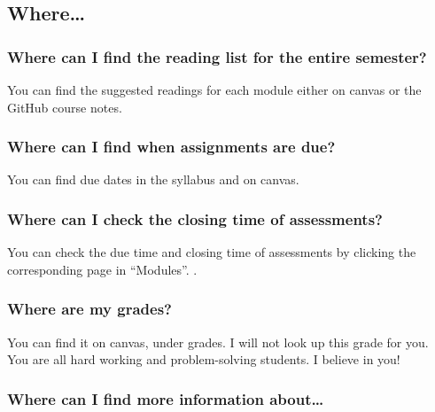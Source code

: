\hypertarget{where}{%
\subsection{Where\ldots{}}\label{where}}

\hypertarget{where-can-i-find-the-reading-list-for-the-entire-semester}{%
\subsubsection{Where can I find the reading list for the entire semester?}\label{where-can-i-find-the-reading-list-for-the-entire-semester}}

You can find the suggested readings for each module either on canvas or the GitHub course notes.

\hypertarget{where-can-i-find-when-assignments-are-due}{%
\subsubsection{Where can I find when assignments are due?}\label{where-can-i-find-when-assignments-are-due}}

You can find due dates in the syllabus and on canvas.

\hypertarget{where-can-i-check-the-closing-time-of-assessments}{%
\subsubsection{Where can I check the closing time of assessments?}\label{where-can-i-check-the-closing-time-of-assessments}}

You can check the due time and closing time of assessments by clicking the corresponding page in ``Modules''. .

\hypertarget{where-are-my-grades}{%
\subsubsection{Where are my grades?}\label{where-are-my-grades}}

You can find it on canvas, under grades. I will not look up this grade for you. You are all hard working and problem-solving students. I believe in you!

\hypertarget{where-can-i-find-more-information-about}{%
\subsubsection{Where can I find more information about\ldots{}}\label{where-can-i-find-more-information-about}}

